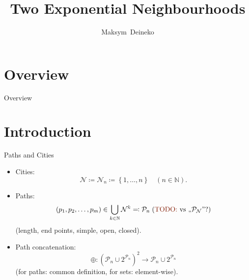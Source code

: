 \documentclass[
  size=10pt,
  style=klope,
  paper=screen,
  pauseslide,
  nopagebreaks,
  hlsections,
  fleqn
]{powerdot}
\title{Two Exponential Neighbourhoods}
\author{Maksym~Deineko \\ {\small \mailto{max.deineko@gmail.com} }}
\def\todo{\color{red}}
\def\eqitspace{\vspace{-5mm}}
\begin{document}
\maketitle

\section[template=wideslide,tocsection=false,slide=false]{Overview}

\begin{slide}[toc=,bm=]{Overview}
\tableofcontents[content=all,type=1]
\end{slide}

\section[template=wideslide]{Introduction}

\begin{slide}[toc=]{Paths and Cities}
\begin{itemize}
  \item
  Cities:
  \begin{equation}
    \mathcal{N} \coloneqq \mathcal{N}_n \coloneqq \left\{1,\ldots,n\right\}
    \quad (n \in \mathbb{N}).
  \end{equation}%
  \eqitspace
  \item
  Paths:
  \begin{equation}
    \left(p_1,p_2,\ldots,p_m\right) \in \bigcup_{k \in \mathbb{N}}\mathcal{N}^k
    \eqqcolon \mathcal{P}_n \;(\text{{\todo TODO: }vs ,,} \mathcal{P}_\mathcal{N}\text{''?}) %
  \end{equation}%
   (length, end points, simple, open, closed).
  \item
  Path concatenation:
  \begin{equation}
    \oplus: {\left( \mathcal{P}_n \cup 2^{\mathcal{P}_n} \right)}^2 \to \mathcal{P}_n \cup 2^{\mathcal{P}_n}
  \end{equation}%
  (for paths: common definition, for sets: element-wise).
\end{itemize}
\end{slide}
\end{document}
